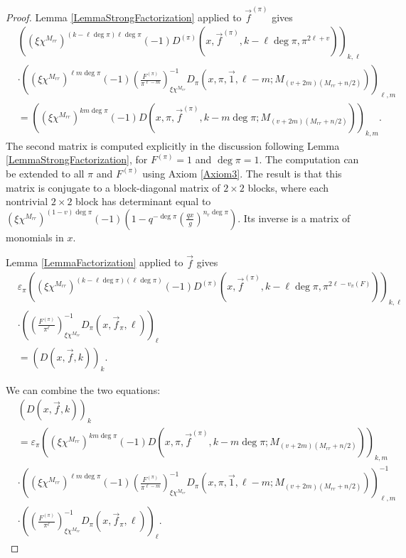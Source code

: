 \documentclass[11pt,letterpaper]{article}
\theoremstyle{definition}
\theoremstyle{remark}
\numberwithin{equation}{section}
\theoremstyle{dotless}
\newcommand{\res}[2]{\left(\frac{#1}{#2}\right)}
\begin{document}
\begin{proof}
Lemma \ref{LemmaStrongFactorization} applied to $\vec{f}^{(\pi)}$ gives 
\begin{equation*}
\begin{split}
&\left( (\xi \chi^{M_{rr}})^{(k-\ell\deg \pi)\ell \deg \pi} (-1)  D^{(\pi)}(x, \vec{f}^{(\pi)}, k-\ell \deg \pi, \pi^{2\ell+v}) \right)_{k, \ell} \\
&\cdot \left((\xi \chi^{M_{rr}})^{\ell m \deg \pi}(-1) \res{F^{(\pi)}}{\pi^{\ell-m}}_{\xi \chi^{M_{rr}}}^{-1}D_\pi(x, \pi, \vec{1}, \ell-m; M_{(v+2m)(M_{rr}+n/2)}) \right)_{\ell,m} \\
&= \left( (\xi \chi^{M_{rr}})^{k m \deg \pi}(-1)D(x, \pi, \vec{f}^{(\pi)}, k-m\deg \pi; M_{(v+2m)(M_{rr}+n/2)}) \right)_{k,m}.
\end{split}
\end{equation*}
The second matrix is computed explicitly in the discussion following Lemma \ref{LemmaStrongFactorization}, for $F^{(\pi)}=1$ and $\deg \pi =1$. The computation can be extended to all $\pi$ and $F^{(\pi)}$ using Axiom \ref{Axiom3}. The result is that this matrix is conjugate to a block-diagonal matrix of $2 \times 2$ blocks, where each nontrivial $2 \times 2$ block has determinant  equal to $(\xi \chi^{M_{rr}})^{(1-v)\deg \pi}(-1)\left( 1- q^{-\deg \pi}\left(\frac{qx}{g}\right)^{n_r \deg \pi}\right)$. Its inverse is a matrix of monomials in $x$.

Lemma \ref{LemmaFactorization} applied to $\vec{f}$ gives 
\begin{equation*}
\begin{split}
&\varepsilon_\pi \left( (\xi \chi^{M_{rr}})^{(k-\ell\deg \pi)(\ell \deg \pi)} (-1)  D^{(\pi)}(x, \vec{f}^{(\pi)}, k-\ell \deg \pi, \pi^{2\ell-v_{\pi}(F)}) \right)_{k, \ell} \\
&\cdot \left( \res{F^{(\pi)}}{\pi^\ell}_{\xi \chi^{M_{rr}}}^{-1} D_\pi(x, \vec{f}_\pi, \ell) \right)_\ell \\
&= \left( D(x, \vec{f}, k) \right)_k.
\end{split}
\end{equation*}

We can combine the two equations:
\begin{equation} \label{LocalGlobalCombo}
\begin{split}
& \left( D(x, \vec{f}, k) \right)_k \\
&=\varepsilon_\pi \left( (\xi \chi^{M_{rr}})^{k m \deg \pi}(-1)D(x, \pi, \vec{f}^{(\pi)}, k-m\deg \pi; M_{(v+2m)(M_{rr}+n/2)}) \right)_{k,m}  \\
&\cdot \left((\xi \chi^{M_{rr}})^{\ell m \deg \pi}(-1) \res{F^{(\pi)}}{\pi^{\ell-m}}_{\xi \chi^{M_{rr}}}^{-1}D_\pi(x, \pi, \vec{1}, \ell-m; M_{(v+2m)(M_{rr}+n/2)}) \right)_{\ell,m}^{-1} \\
&\cdot \left( \res{F^{(\pi)}}{\pi^\ell}_{\xi \chi^{M_{rr}}}^{-1} D_\pi(x, \vec{f}_\pi, \ell) \right)_\ell.
\end{split}
\end{equation}


\end{proof}
\end{document}
